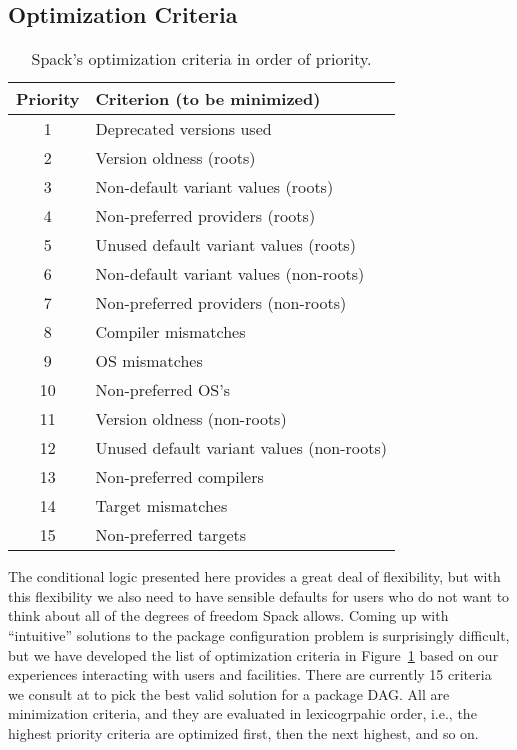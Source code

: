 \subsection{Optimization Criteria}

\begin{table}[t]
\centering
\begin{tabular}{| c || l |}
 \hline
 Priority & Criterion (to be minimized) \\
 \hline\hline
 1  & Deprecated versions used \\
 \hline
 2  & Version oldness (roots) \\
 3  & Non-default variant values (roots) \\
 4  & Non-preferred providers (roots) \\
 5  & Unused default variant values (roots) \\
 \hline
 6  & Non-default variant values (non-roots) \\
 7  & Non-preferred providers (non-roots) \\
 \hline
 8  & Compiler mismatches \\
 9  & OS mismatches \\
 10 & Non-preferred OS's \\
 \hline
 11 & Version oldness (non-roots) \\
 12 & Unused default variant values (non-roots) \\
 \hline
 13 & Non-preferred compilers \\
 14 & Target mismatches \\
 15 & Non-preferred targets \\
 \hline
\end{tabular}
\caption{Spack's optimization criteria in order of priority.}
\label{table:optimization-criteria}
\end{table}

The conditional logic presented here provides a great deal of flexibility, but with this
flexibility we also need to have sensible defaults for users who do not want to think
about all of the degrees of freedom Spack allows. Coming up with ``intuitive'' solutions
to the package configuration problem is surprisingly difficult, but we have developed
the list of optimization criteria in Figure~\ref{table:optimization-criteria} based on
our experiences interacting with users and facilities. There are currently 15 criteria
we consult at to pick the best valid solution for a package DAG. All are minimization
criteria, and they are evaluated in lexicogrpahic order, i.e., the highest priority
criteria are optimized first, then the next highest, and so on.

